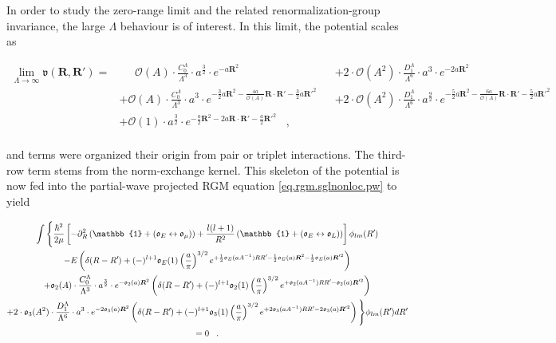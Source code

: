 \documentclass[onecolumn,preprint,superscriptaddress,nofootinbib,notitlepage,10pt,linenumbers]{revtex4-1}
\newcommand*{\mprime}{^{\prime}\mkern-1.2mu}
\newcommand{\la}{\label}
\newcommand{\ve}[1]{\ensuremath{\boldsymbol{#1}}}
\begin{document}
In order to study the zero-range limit and the related renormalization-group invariance, the large $\Lambda$
behaviour is of interest. In this limit, the potential scales as
%
\begin{widetext}
\begin{align*}
\lim_{\Lambda\to\infty}\mathfrak{v}(\ve{R},\ve{R}')=&\;\;\;\;\;\mathcal{O}(A)\cdot\frac{C_0^\Lambda}{\Lambda^3}\cdot a^{\frac{3}{2}}\cdot e^{-a\ve{R}^2}
&&+2\cdot\mathcal{O}(A^2)\cdot \frac{D_1^\Lambda}{\Lambda^6}\cdot a^3\cdot e^{-2a\ve{R}^2}\\
&+\mathcal{O}(A)\cdot\frac{C_0^\Lambda}{\Lambda^3}\cdot a^{3}\cdot e^{-\frac{3}{2}a\ve{R}^2-\frac{4a}{\mathcal{O}(A)}\ve{R}\cdot\ve{R}'-\frac{3}{2}a\ve{R}'^2}
&&+2\cdot\mathcal{O}(A^2)\cdot\frac{D_1^\Lambda}{\Lambda^6}\cdot a^{\frac{9}{2}}\cdot e^{-\frac{5}{2}a\ve{R}^2-\frac{6a}{\mathcal{O}(A)}\ve{R}\cdot\ve{R}'-\frac{5}{2}a\ve{R}'^2}\\
&+\mathcal{O}(1)\cdot a^{\frac{3}{2}}\cdot e^{-\frac{a}{2}\ve{R}^2-2a\ve{R}\cdot\ve{R}'-\frac{a}{2}\ve{R}'^2}\;\;\;,&&\\
\end{align*}
\end{widetext}
and terms were organized their origin from pair or triplet interactions. The third-row term stems from the norm-exchange
kernel. This skeleton of the potential is now fed into the partial-wave projected RGM equation \eqref{eq.rgm.sglnonloc.pw}
to yield
%
\begin{widetext}
\begin{subequations}\la{eq.rgm.pw}
\begin{gather}
\int\Bigg\lbrace\frac{\hbar^2}{2\mu}\left[-\partial^2_R\left(\mathbb{1}+(\mathfrak{o}_E\leftrightarrow\mathfrak{o}_\mu)\right)+
\frac{l(l+1)}{R^2}\left(\mathbb{1}+(\mathfrak{o}_E\leftrightarrow\mathfrak{o}_L)\right)\right]
\phi_{lm}(R\mprime)\la{eq.rgm.pw.a}\\
%
-E\left(\delta(R-R\mprime)+(-)^{l+1}\mathfrak{o}_E(1)\left(\frac{a}{\pi}\right)^{3/2}
e^{+\frac{1}{2}\mathfrak{o}_E(aA^{-1})RR\mprime-\frac{1}{2}\mathfrak{o}_E(a)\ve{R}^2-\frac{1}{2}\mathfrak{o}_E(a)\ve{R}'^2}\right)\la{eq.rgm.pw.b}\\
%
+\mathfrak{o}_2(A)\cdot\frac{C_0^\Lambda}{\Lambda^3}\cdot a^{\frac{3}{2}}\cdot
e^{-\mathfrak{o}_2(a)\ve{R}^2}
\left(\delta(R-R\mprime)+(-)^{l+1}\mathfrak{o}_2(1)\left(\frac{a}{\pi}\right)^{3/2}
e^{+\mathfrak{o}_2(aA^{-1})RR\mprime-\mathfrak{o}_2(a)\ve{R}'^2}\right)\la{eq.rgm.pw.c}\\
%
+2\cdot\mathfrak{o}_3(A^2)\cdot\frac{D_1^\Lambda}{\Lambda^6}\cdot a^{3}\cdot
e^{-2\mathfrak{o}_3(a)\ve{R}^2}
\left(\delta(R-R\mprime)+(-)^{l+1}\mathfrak{o}_3(1)\left(\frac{a}{\pi}\right)^{3/2}
e^{+2\mathfrak{o}_3(aA^{-1})RR\mprime-2\mathfrak{o}_3(a)\ve{R}'^2}\right)
\Bigg\rbrace\phi_{lm}(R\mprime)dR\mprime\la{eq.rgm.pw.d}\\
 =0\;\;\;.\nonumber
\end{gather}
\end{subequations}
\end{widetext}
\end{document}
